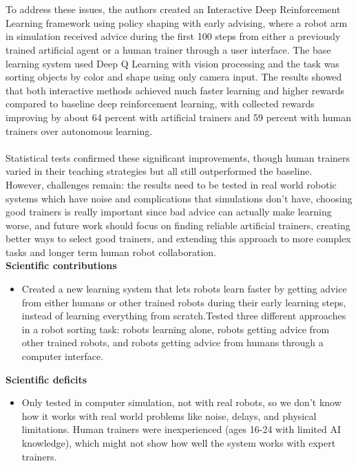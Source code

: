 \documentclass[report.tex]{subfiles}
\begin{document}
\noindent\textbf{}\\\\To address these issues, the authors created an Interactive Deep Reinforcement Learning framework using policy shaping with early advising, where a robot arm in simulation received advice during the first 100 steps from either a previously trained artificial agent or a human trainer through a user interface. The base learning system used Deep Q Learning with vision processing and the task was sorting objects by color and shape using only camera input. The results showed that both interactive methods achieved much faster learning and higher rewards compared to baseline deep reinforcement learning, with collected rewards improving by about 64 percent with artificial trainers and 59 percent with human trainers over autonomous learning. \\\\Statistical tests confirmed these significant improvements, though human trainers varied in their teaching strategies but all still outperformed the baseline. However, challenges remain: the results need to be tested in real world robotic systems which have noise and complications that simulations don't have, choosing good trainers is really important since bad advice can actually make learning worse, and future work should focus on finding reliable artificial trainers, creating better ways to select good trainers, and extending this approach to more complex tasks and longer term human     robot collaboration.\\




\noindent\textbf{Scientific contributions} 
\begin{itemize}
        \item  Created a new learning system that lets robots learn faster by getting advice from either humans or other trained robots during their early learning steps, instead of learning everything from scratch.Tested three different approaches in a robot sorting task: robots learning alone, robots getting advice from other trained robots, and robots getting advice from humans through a computer interface. 
        
\end{itemize}

\noindent\textbf{Scientific deficits} 
\begin{itemize}
        \item  Only tested in computer simulation, not with real robots, so we don't know how it works with real world problems like noise, delays, and physical limitations. Human trainers were inexperienced (ages 16-24 with limited AI knowledge), which might not show how well the system works with expert trainers. 
       
\end{itemize}
\end{document}
